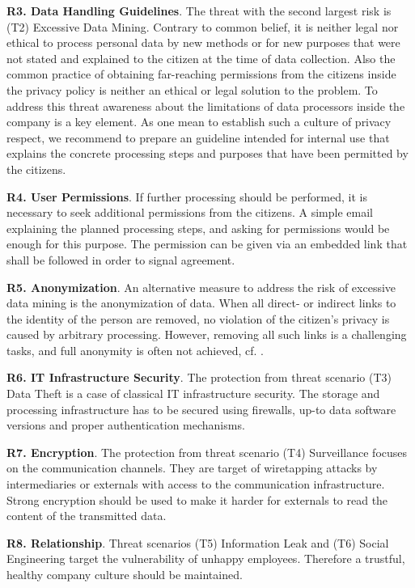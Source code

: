 \documentclass[runningheads,a4paper]{llncs}
\begin{document}
\textbf{R3. Data Handling Guidelines}. The threat with the second largest risk is (T2) Excessive Data Mining.
Contrary to common belief, it is neither legal nor ethical to process
personal data by new methods or for new purposes that were not
stated and explained to the citizen at the time of data
collection. Also the common practice of obtaining far-reaching
permissions from the citizens inside the privacy policy is neither an
ethical or legal solution to the problem. To address this threat awareness about the limitations of data
processors inside the company is a key element. As one mean to
establish such a culture of privacy respect, we recommend to prepare
an guideline intended for internal use that explains the concrete processing steps and purposes that have been permitted by the citizens. 

\textbf{R4. User Permissions}. If further processing should be performed, it is necessary to seek additional permissions from the citizens. A simple email explaining the planned processing steps, and asking for permissions would be enough for this purpose. The permission can be given via an embedded link that shall be followed in order to signal agreement.

\textbf{R5. Anonymization}. An alternative measure to address the risk of excessive data mining is the anonymization of data. When all direct- or indirect
links to the identity of the person are removed, no violation of the
citizen's privacy is caused by arbitrary processing. However, removing all
such links is a challenging tasks, and full anonymity is often not
achieved, cf. \cite{krumm2009}.

\textbf{R6. IT Infrastructure Security}. The protection from threat scenario (T3) Data Theft is a case of
classical IT infrastructure security. The storage and processing infrastructure has
to be secured using firewalls, up-to data software versions and proper
authentication mechanisms.

\textbf{R7. Encryption}. The protection from threat scenario (T4) Surveillance focuses on the
communication channels. They are target of wiretapping attacks by
intermediaries or externals with access to the communication
infrastructure. Strong encryption should be used to make
it harder for externals to read the content of the transmitted data.

\textbf{R8. Relationship}. Threat scenarios (T5) Information Leak and (T6) Social Engineering
target the vulnerability of unhappy employees. Therefore a trustful,
healthy company culture should be maintained.
\end{document}
